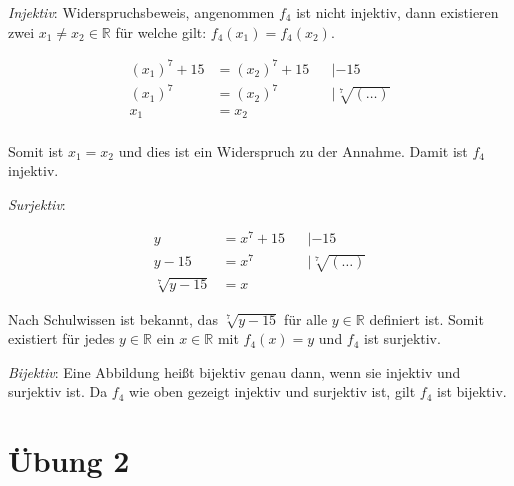 \documentclass{article}
\begin{document}
\begin{enumerate}[(i)]
  \emph{Injektiv}: Widerspruchsbeweis, angenommen $f_4$ ist nicht injektiv, dann existieren zwei
  $x_1 \ne x_2 \in \mathbb{R}$ für welche gilt: $f_4(x_1) = f_4(x_2)$.

  \begin{align*}
    (x_1)^7 + 15 &= (x_2)^7 + 15 && | -15 \\
    (x_1)^7      &= (x_2)^7      && | \sqrt[7]{(\ldots)} \\
    x_1          &= x_2 \\
  \end{align*}

  Somit ist $x_1 = x_2$ und dies ist ein Widerspruch zu der Annahme. Damit ist $f_4$ injektiv.

  \emph{Surjektiv}:

  \begin{align*}
    y                &= x^7 +  15 && | -15 \\
    y - 15           &= x^7      && | \sqrt[7]{(\ldots)} \\
    \sqrt[7]{y - 15} &= x
  \end{align*}

  Nach Schulwissen ist bekannt, das $\sqrt[7]{y - 15}$ für alle $y \in \mathbb{R}$ definiert ist.
  Somit existiert für jedes $y \in \mathbb{R}$ ein $x \in \mathbb{R}$ mit $f_4(x) = y$ und $f_4$ ist
  surjektiv.

  \emph{Bijektiv}: Eine Abbildung heißt bijektiv genau dann, wenn sie injektiv und surjektiv ist.
  Da $f_4$ wie oben gezeigt injektiv und surjektiv ist, gilt $f_4$ ist bijektiv.

\end{enumerate}

\section*{Übung 2}
\end{document}
